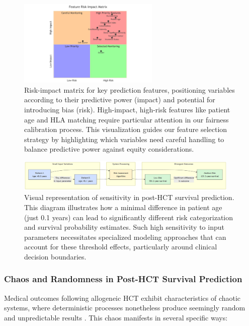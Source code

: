 \begin{figure}[H]
    \centering
    \includegraphics[width=0.6\textwidth]{figures/RiskImpactMatrix.png}
    \caption{Risk-impact matrix for key prediction features, positioning variables according to their predictive power (impact) and potential for introducing bias (risk). High-impact, high-risk features like patient age and HLA matching require particular attention in our fairness calibration process. This visualization guides our feature selection strategy by highlighting which variables need careful handling to balance predictive power against equity considerations.}
    \label{fig:risk_impact_matrix}
\end{figure}

\begin{figure}[H]
    \centering
    \includegraphics[width=0.95\textwidth]{figures/SensitivityDiagram.png}
    \caption{Visual representation of sensitivity in post-HCT survival prediction. This diagram illustrates how a minimal difference in patient age (just 0.1 years) can lead to significantly different risk categorization and survival probability estimates. Such high sensitivity to input parameters necessitates specialized modeling approaches that can account for these threshold effects, particularly around clinical decision boundaries.}
    \label{fig:sensitivity_diagram}
\end{figure}

\subsubsection{Chaos and Randomness in Post-HCT Survival Prediction}

Medical outcomes following allogeneic HCT exhibit characteristics of chaotic systems, where deterministic processes nonetheless produce seemingly random and unpredictable results \cite{frontiers_ai_hct}. This chaos manifests in several specific ways:

